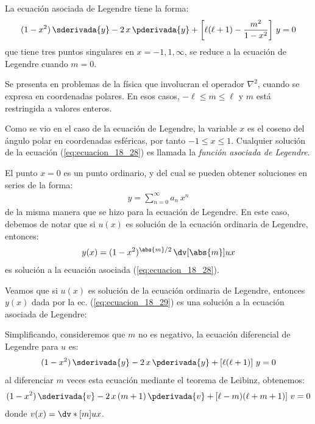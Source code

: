 La ecuación asociada de Legendre tiene la forma:
\begin{align}
(1 - x^{2}) \, \sderivada{y} - 2 \, x \, \pderivada{y} + \left[ \ell (\ell + 1) - \dfrac{m^{2}}{1 - x^{2}} \right] \, y = 0
\label{eq:ecuacion_18_28}
\end{align}
que tiene tres puntos singulares en $x = -1, 1, \infty$, se reduce a la ecuación de Legendre cuando $m = 0$.
\par
Se presenta en problemas de la física que involucran el operador $\nabla^{2}$, cuando se expresa en coordenadas polares. En esos casos, $- \ell \leq m \leq \ell$ y $m$ está restringida a valores enteros.
\par
Como se vio en el caso de la ecuación de Legendre, la variable $x$ es el coseno del ángulo polar en coordenadas esféricas, por tanto $-1 \leq x \leq 1$. Cualquier solución de la ecuación (\ref{eq:ecuacion_18_28}) es llamada la \emph{función asociada de Legendre}.
\par
El punto $x = 0$ es un punto ordinario, y del cual se pueden obtener soluciones en series de la forma:
\begin{align*}
y = \sum_{n=0}^{\infty} a_{n} \, x^{n}
\end{align*}
de la misma manera que se hizo para la ecuación de Legendre. En este caso, debemos de notar que si $u(x)$ es solución de la ecuación ordinaria de Legendre, entonces:
\begin{align}
y(x) = (1 -x^{2})^{\abs{m}/2} \, \dv[\abs{m}]{u}{x}
\label{eq:ecuacion_18_29}
\end{align}
es solución a la ecuación asociada (\ref{eq:ecuacion_18_28}).
\par
Veamos que si $u(x)$ es solución de la ecuación ordinaria de Legendre, entonces $y(x)$ dada por la ec. (\ref{eq:ecuacion_18_29}) es una solución a la ecuación asociada de Legendre:
\par
Simplificando, consideremos que $m$ no es negativo, la ecuación diferencial de Legendre para $u$ es:
\begin{align*}
(1 - x^{2}) \, \sderivada{y} - 2 \, x \, \pderivada{y} + \left[ \ell (\ell + 1) \right] \, y = 0
\end{align*}
al diferenciar $m$ veces esta ecuación mediante el teorema de Leibinz, obtenemos:
\begin{align}
(1 - x^{2}) \, \sderivada{v} - 2 \, x \, (m + 1) \, \pderivada{v} + \left[ \ell - m) (\ell + m + 1) \right] \, v = 0
\label{eq:ecuacion_18_30}
\end{align}
donde $v(x) = \dv*[m]{u}{x}$.
